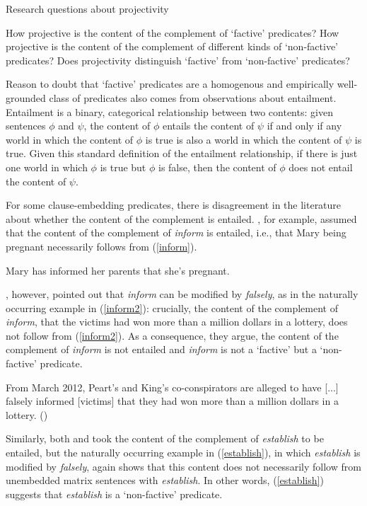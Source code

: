 \documentclass[11pt,fleqn]{article}
\newcommand{\6}{\mbox{$[\hspace*{-.6mm}[$}}
\newcommand{\9}{\mbox{$]\hspace*{-.6mm}]$}}
\begin{document}
\begin{exe}
\ex\label{prq} Research questions about projectivity
\begin{xlist}
\ex How projective is the content of the complement of `factive' predicates?
\ex How projective is the content of the complement of different kinds of `non-factive' predicates?
\ex Does projectivity distinguish `factive' from `non-factive' predicates?
\end{xlist}
\end{exe}

Reason to doubt that `factive' predicates are a homogenous and empirically well-grounded class of predicates also comes from observations about entailment. Entailment is a binary, categorical relationship between two contents: given sentences $\phi$ and $\psi$, the content of $\phi$ entails the content of $\psi$ if and only if any world in which the content of $\phi$ is true is also a world in which the content of $\psi$ is true. Given this standard definition of the entailment relationship, if there is just one world in which $\phi$ is true but $\phi$ is false, then the content of $\phi$ does not entail the content of $\psi$.

For some clause-embedding predicates, there is disagreement in the literature about whether the content of the complement is entailed. \citet[139]{schlenker10}, for example, assumed that the content of the complement of {\em inform} is entailed, i.e., that Mary being pregnant necessarily follows from (\ref{inform}).  

\begin{exe}
\ex\label{inform} Mary has informed her parents that she's pregnant.

\end{exe}
\citet[76]{anand-hacquard2014}, however, pointed out that {\em inform} can be modified by {\em falsely}, as in the naturally occurring example in (\ref{inform2}): crucially, the content of the complement of {\em inform}, that the victims had won more than a million dollars in a lottery, does not follow from (\ref{inform2}). As a consequence, they argue, the content of the complement of {\em inform}  is not entailed and {\em inform} is not a `factive' but a `non-factive' predicate.

\begin{exe}
\ex\label{inform2} From March 2012, Peart's and King's co-conspirators are alleged to have [...] falsely informed [victims] that they had won more than a million dollars in a lottery. \hfill (\citealt[76]{anand-hacquard2014})
\end{exe}
Similarly, both \citet{wyse} and \citet{swanson2012} took the content of the complement of {\em establish} to be entailed, but the naturally occurring example in (\ref{establish}), in which {\em establish} is  modified by {\em falsely}, again shows that this content does not necessarily follow from unembedded matrix sentences with {\em establish}. In other words, (\ref{establish}) suggests that {\em establish} is a `non-factive' predicate.
\end{document}
